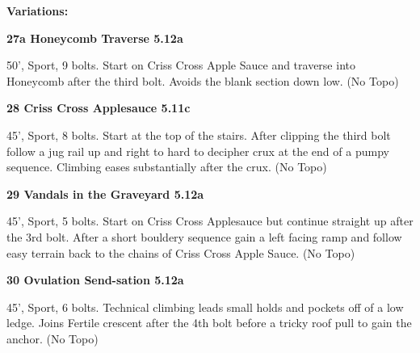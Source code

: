 \begin{multicols}{2}
\begin{adjustwidth}{0.5cm}{}				
\needspace{3cm}
\textbf{Variations:} \newline

\needspace{1.5cm}
\label{vr:Honeycomb Traverse}
\colorbox{Goldenrod!50}{
\parbox{0.95\linewidth}{
\textbf{
27a Honeycomb Traverse 5.12a  
}}}

\begin{adjustwidth}{0.5cm}{}			
50', Sport, 9 bolts. Start on Criss Cross Apple Sauce and traverse into Honeycomb after the third bolt. Avoids the blank section down low. (No Topo)
\end{adjustwidth}


\end{adjustwidth}


\needspace{1.5cm}
\label{rt:Criss Cross Applesauce}
\colorbox{RoyalBlue!20}{
\parbox{0.95\linewidth}{
\textbf{
28 Criss Cross Applesauce 5.11c  
}}}

\begin{adjustwidth}{0.5cm}{}			
45', Sport, 8 bolts. Start at the top of the stairs. After clipping the third bolt follow a jug rail up and right to hard to decipher crux at the end of a pumpy sequence. Climbing eases substantially after the crux. (No Topo)
\end{adjustwidth}



\needspace{1.5cm}
\label{rt:Vandals in the Graveyard}
\colorbox{Goldenrod!50}{
\parbox{0.95\linewidth}{
\textbf{
29 Vandals in the Graveyard 5.12a  
}}}

\begin{adjustwidth}{0.5cm}{}			
45', Sport, 5 bolts. Start on Criss Cross Applesauce but continue straight up after the 3rd bolt. After a short bouldery sequence gain a left facing ramp and follow easy terrain back to the chains of Criss Cross Apple Sauce. (No Topo)
\end{adjustwidth}



\needspace{1.5cm}
\label{rt:Ovulation Send-sation}
\colorbox{Goldenrod!50}{
\parbox{0.95\linewidth}{
\textbf{
30 Ovulation Send-sation 5.12a  
}}}

\begin{adjustwidth}{0.5cm}{}			
45', Sport, 6 bolts. Technical climbing leads small holds and pockets off of a low ledge. Joins Fertile crescent after the 4th bolt before a tricky roof pull to gain the anchor. (No Topo)
\end{adjustwidth}


\end{multicols}
